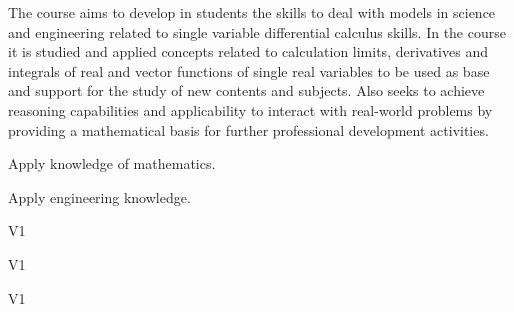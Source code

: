 \begin{syllabus}


\begin{justification}
The course aims to develop in students the skills to deal with models in science and engineering related to single variable differential calculus skills. In the course it is studied and applied concepts related to calculation limits, derivatives and integrals of real and vector functions of single real variables to be used as base and support for the study of new contents and subjects. 
Also seeks to achieve reasoning capabilities and applicability to interact with real-world problems by providing a mathematical basis for further professional development activities.
\end{justification}

\begin{goals}
\item Apply knowledge of mathematics.
\item Apply engineering knowledge.
\end{goals}

\begin{outcomes}{V1}
   \item {}
   \item {}
\end{outcomes}

\begin{specificoutcomes}{V1}
   \item {}
   \item {}
   \item {}
   \item {}
   \item {}
   \item {}
   \item {}
\end{specificoutcomes}

\begin{competences}{V1}
   \item {}
   \item {}
   \item {}
\end{competences}


\end{syllabus}
